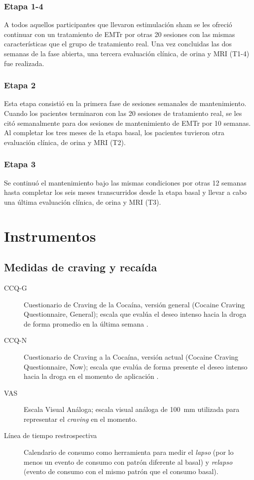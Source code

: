 \subsubsection{Etapa 1-4}
A todos aquellos participantes que llevaron estimulación sham se les ofreció continuar con un tratamiento de EMTr por otras 20 sesiones con las mismas características que el grupo de tratamiento real. Una vez concluidas las dos semanas de la fase abierta, una tercera evaluación clínica, de orina y MRI (T1-4) fue realizada.

\subsubsection{Etapa 2}
Esta etapa consistió en la primera fase de sesiones semanales de mantenimiento. Cuando los pacientes terminaron con las 20 sesiones de tratamiento real, se les citó semanalmente para dos sesiones de mantenimiento de EMTr por 10 semanas. Al completar los tres meses de la etapa basal, los pacientes tuvieron otra evaluación clínica, de orina y MRI (T2).

\subsubsection{Etapa 3}
Se continuó el mantenimiento bajo las mismas condiciones por otras 12 semanas hasta completar los seis meses transcurridos desde la etapa basal y llevar a cabo una última evaluación clínica, de orina y MRI (T3).

\section{Instrumentos}
\subsection{Medidas de craving y recaída}
\begin{description}
    \item[CCQ-G] Cuestionario de Craving de la Cocaína, versión general (Cocaine Craving Questionnaire, General); escala que evalúa el deseo intenso hacia la droga de forma promedio en la última semana \parencite{Tiffany1993}.
    \item[CCQ-N] Cuestionario de Craving a la Cocaína, versión actual (Cocaine Craving Questionnaire, Now); escala que evalúa de forma presente el deseo intenso hacia la droga en el momento de aplicación \parencite{Tiffany1993}.
    \item[VAS] Escala Visual Análoga; escala visual análoga de \SI{100}{\milli\meter} utilizada para representar el \textit{craving} en el momento.
    \item[Línea de tiempo restrospectiva] Calendario de consumo como herramienta para medir el \emph{lapso} (por lo menos un evento de consumo con patrón diferente al basal) y \emph{relapso} (evento de consumo con el mismo patrón que el consumo basal).
\end{description}
